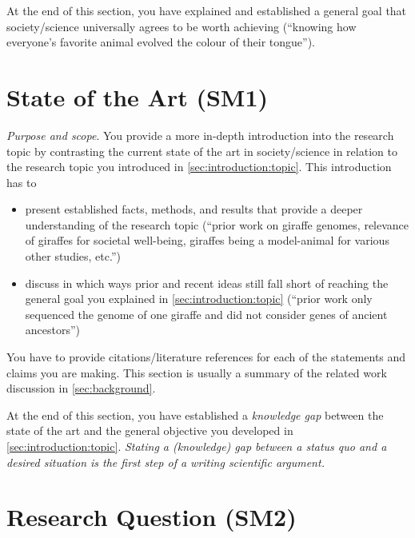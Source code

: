 \documentclass[
  numbers=noenddot,
  english,  %
  a4paper,  %
  twoside,  %
  bibliography=totoc,
  headsepline,
  cleardoublepage=empty,
  parskip=half,
  draft=false
]{scrbook}
\theoremstyle{break}
\begin{document}
At the end of this section, you have explained and established a general goal that society/science universally agrees to be worth achieving (``knowing how everyone's favorite animal evolved the colour of their tongue'').

\section{State of the Art (SM1)}\label{sec:introduction:state-of-art}

\emph{Purpose and scope}.
You provide a more in-depth introduction into the research topic by contrasting the current state of the art in society/science in relation to the research topic you introduced in \cref{sec:introduction:topic}.
This introduction has to

\begin{itemize}
  \item present established facts, methods, and results that provide a deeper understanding of the research topic (``prior work on giraffe genomes, relevance of giraffes for societal well-being, giraffes being a model-animal for various other studies, etc.'')
  \item discuss in which ways prior and recent ideas still fall short of reaching the general goal you explained in \cref{sec:introduction:topic} (``prior work only sequenced the genome of one giraffe and did not consider genes of ancient ancestors'')
\end{itemize}

You have to provide citations/literature references for each of the statements and claims you are making.
This section is usually a summary of the related work discussion in \cref{sec:background}.

At the end of this section, you have established a \emph{knowledge gap} between the state of the art and the general objective you developed in \cref{sec:introduction:topic}.
\emph{Stating a (knowledge) gap between a status quo and a desired situation is the \emph{first step} of a writing scientific argument.}


\section{Research Question (SM2)}\label{sec:introduction:research-question}
\end{document}

